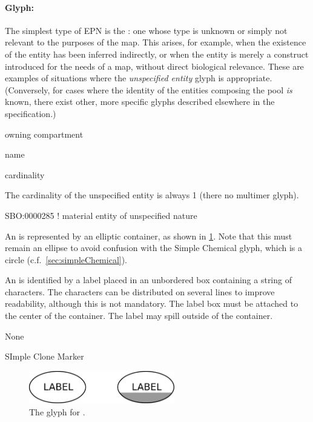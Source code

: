\paragraph{Glyph: }
\label{sec:unspecifiedEntity}

The simplest type of EPN is the : one whose type is unknown or simply not relevant to the purposes of the map.  This arises, for example, when the existence of the entity has been inferred indirectly, or when the entity is merely a construct introduced for the needs of a map, without direct biological relevance.  These are examples of situations where the \emph{unspecified entity} glyph is appropriate.  (Conversely, for cases where the identity of the entities composing the pool \emph{is} known, there exist other, more specific glyphs described elsewhere in the specification.)

\begin{glyphDescription}

 \begin{glyphIdentity}
  \item owning compartment
  \item name
  \item cardinality
  \end{glyphIdentity}
\glyphRules The cardinality of
  the unspecified entity is always 1 (there no multimer glyph).


\glyphSboTerm SBO:0000285 ! material entity of unspecified nature 

\glyphContainer An  is represented by an
elliptic container, as shown in \ref{fig:unspecified}.  Note that this
must remain an ellipse to avoid confusion with the Simple Chemical
glyph, which is a circle (c.f.\, \ref{sec:simpleChemical}).

\glyphLabel An  is identified by a label
placed in an unbordered box containing a string of characters.  The
characters can be distributed on several lines to improve readability,
although this is not mandatory.  The label box must be attached to the
center of the container.  The label may spill outside of the
container.

\glyphAux None

\glyphCloning SImple Clone Marker

\end{glyphDescription}

\begin{figure}[H]
  \centering
  \includegraphics[width=2.5in]{images/unspecified}
  \caption{The \PD glyph for .}
  \label{fig:unspecified}
\end{figure}

